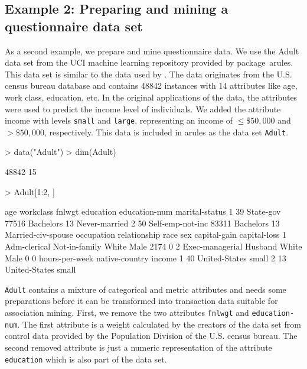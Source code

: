 \documentclass[10pt,a4paper]{article}
\newcommand{\strong}[1]{{\normalfont\fontseries{b}\selectfont #1}}
\newcommand{\code}[1]{\texttt{#1}}
\newcommand{\pkg}[1]{\strong{#1}}
\begin{document}
\subsection{Example 2: Preparing and mining a 
questionnaire data set\label{sec:example-adult}}

As a second example, 
we prepare and mine questionnaire data.
We use the Adult data set from the UCI machine
learning repository \citep{arules:Blake+Merz:1998} provided by
package~\pkg{arules}.  This data set is similar to the data used by
\cite{arules:Hastie+Tibshirani+Friedman:2001}.  The data originates from
the U.S. census bureau database and contains 48842 instances with 14
attributes like age, work class, education, etc. 
In the original applications of the data, the
attributes were used to predict the income level of individuals.
We added the attribute income with levels \code{small} and \code{large},
representing an income of $\le \$50,000$ and $> \$50,000$, respectively.
This data is included in \pkg{arules} 
as the data set \code{Adult}.


\begin{Schunk}
\begin{Sinput}
> data("Adult")
> dim(Adult)
\end{Sinput}
\begin{Soutput}
[1] 48842    15
\end{Soutput}
\begin{Sinput}
> Adult[1:2, ]
\end{Sinput}
\begin{Soutput}
  age        workclass fnlwgt education education-num     marital-status
1  39        State-gov  77516 Bachelors            13      Never-married
2  50 Self-emp-not-inc  83311 Bachelors            13 Married-civ-spouse
       occupation  relationship  race  sex capital-gain capital-loss
1    Adm-clerical Not-in-family White Male         2174            0
2 Exec-managerial       Husband White Male            0            0
  hours-per-week native-country income
1             40  United-States  small
2             13  United-States  small
\end{Soutput}
\end{Schunk}


\code{Adult} contains a mixture of categorical and metric attributes and
needs some preparations before it can be transformed into
transaction data suitable for association mining.
First, we remove the two attributes \code{fnlwgt} and
\code{education-num}. The first attribute is a weight calculated
by the creators of the data set from control data provided by
the Population Division of the U.S. census bureau. 
The second removed attribute is just a numeric representation of the
attribute \code{education} which is also part of the data set.
\end{document}
